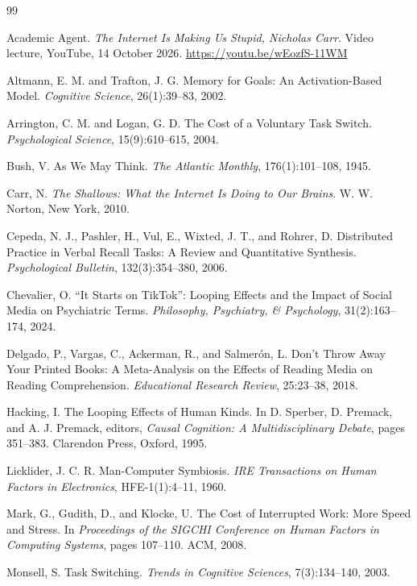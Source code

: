 \documentclass[12pt]{article}
\begin{document}
\newpage
\begin{thebibliography}{99}

Academic Agent. \emph{The Internet Is Making Us Stupid, Nicholas Carr}. Video lecture, YouTube, 14 October 2026. \url{https://youtu.be/wEozfS-11WM}

Altmann, E. M. and Trafton, J. G. Memory for Goals: An Activation-Based Model. \emph{Cognitive Science}, 26(1):39--83, 2002.

Arrington, C. M. and Logan, G. D. The Cost of a Voluntary Task Switch. \emph{Psychological Science}, 15(9):610--615, 2004.

Bush, V. As We May Think. \emph{The Atlantic Monthly}, 176(1):101--108, 1945.

Carr, N. \emph{The Shallows: What the Internet Is Doing to Our Brains}. W. W. Norton, New York, 2010.

Cepeda, N. J., Pashler, H., Vul, E., Wixted, J. T., and Rohrer, D. Distributed Practice in Verbal Recall Tasks: A Review and Quantitative Synthesis. \emph{Psychological Bulletin}, 132(3):354--380, 2006.

Chevalier, O. ``It Starts on TikTok'': Looping Effects and the Impact of Social Media on Psychiatric Terms. \emph{Philosophy, Psychiatry, \& Psychology}, 31(2):163--174, 2024.

Delgado, P., Vargas, C., Ackerman, R., and Salmer\'on, L. Don't Throw Away Your Printed Books: A Meta-Analysis on the Effects of Reading Media on Reading Comprehension. \emph{Educational Research Review}, 25:23--38, 2018.

Hacking, I. The Looping Effects of Human Kinds. In D. Sperber, D. Premack, and A. J. Premack, editors, \emph{Causal Cognition: A Multidisciplinary Debate}, pages 351--383. Clarendon Press, Oxford, 1995.

Licklider, J. C. R. Man-Computer Symbiosis. \emph{IRE Transactions on Human Factors in Electronics}, HFE-1(1):4--11, 1960.

Mark, G., Gudith, D., and Klocke, U. The Cost of Interrupted Work: More Speed and Stress. In \emph{Proceedings of the SIGCHI Conference on Human Factors in Computing Systems}, pages 107--110. ACM, 2008.

Monsell, S. Task Switching. \emph{Trends in Cognitive Sciences}, 7(3):134--140, 2003.


\end{thebibliography}
\end{document}

